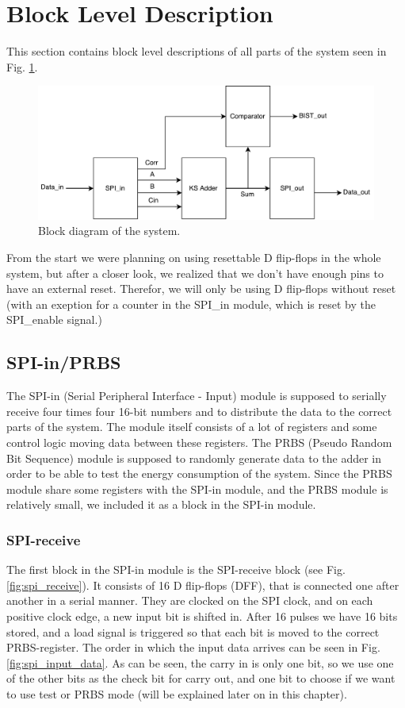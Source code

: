 \section{Block Level Description} \label{sec:block_level}
This section contains block level descriptions of all parts of the system seen in Fig. \ref{fig:top_level}. 

\begin{figure}[H]
  \centering
  \captionsetup{justification=centering}
  \includegraphics[scale=0.5]{../figures/TOP.pdf}
  \caption{Block diagram of the system.} \label{fig:top_level}
\end{figure}

From the start we were planning on using resettable D flip-flops in the whole system, but after a closer look, we realized that we don't have enough pins to have an external reset. Therefor, we will only be using D flip-flops without reset (with an exeption for a counter in the SPI\_in module, which is reset by the SPI\_enable signal.)


\subsection{SPI-in/PRBS}
The SPI-in (Serial Peripheral Interface - Input) module is supposed to serially receive four times four 16-bit numbers and to distribute the data to the correct parts of the system. The module itself consists of a lot of registers and some control logic moving data between these registers. The PRBS (Pseudo Random Bit Sequence) module is supposed to randomly generate data to the adder in order to be able to test the energy consumption of the system. Since the PRBS module share some registers with the SPI-in module, and the PRBS module is relatively small, we included it as a block in the SPI-in module.

\subsubsection{SPI-receive}
The first block in the SPI-in module is the SPI-receive block (see Fig. \ref{fig:spi_receive}). It consists of 16 D flip-flops (DFF), that is connected one after another in a serial manner. They are clocked on the SPI clock, and on each positive clock edge, a new input bit is shifted in. After 16 pulses we have 16 bits stored, and a load signal is triggered so that each bit is moved to the correct PRBS-register. The order in which the input data arrives can be seen in Fig. \ref{fig:spi_input_data}. As can be seen, the carry in is only one bit, so we use one of the other bits as the check bit for carry out, and one bit to choose if we want to use test or PRBS mode (will be explained later on in this chapter).

